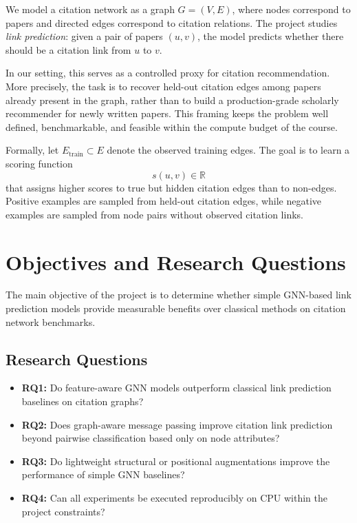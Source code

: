 \documentclass[11pt,a4paper]{article}
\begin{document}
We model a citation network as a graph $G=(V,E)$, where nodes correspond to papers
and directed edges correspond to citation relations.
The project studies \emph{link prediction}: given a pair of papers $(u,v)$,
the model predicts whether there should be a citation link from $u$ to $v$.

In our setting, this serves as a controlled proxy for citation recommendation.
More precisely, the task is to recover held-out citation edges among papers already present
in the graph, rather than to build a production-grade scholarly recommender for newly written papers.
This framing keeps the problem well defined, benchmarkable, and feasible within the compute budget
of the course.

Formally, let $E_{\mathrm{train}} \subset E$ denote the observed training edges.
The goal is to learn a scoring function
\[
s(u,v) \in \mathbb{R}
\]
that assigns higher scores to true but hidden citation edges than to non-edges.
Positive examples are sampled from held-out citation edges, while negative examples are sampled
from node pairs without observed citation links.

\section{Objectives and Research Questions}

The main objective of the project is to determine whether simple GNN-based link prediction models
provide measurable benefits over classical methods on citation network benchmarks.

\subsection{Research Questions}
\begin{itemize}
    \item \textbf{RQ1:} Do feature-aware GNN models outperform classical link prediction baselines on citation graphs?
    \item \textbf{RQ2:} Does graph-aware message passing improve citation link prediction beyond pairwise classification based only on node attributes?
    \item \textbf{RQ3:} Do lightweight structural or positional augmentations improve the performance of simple GNN baselines?
    \item \textbf{RQ4:} Can all experiments be executed reproducibly on CPU within the project constraints?
\end{itemize}
\end{document}
